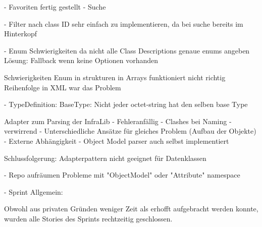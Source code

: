 - Favoriten fertig gestellt
- Suche

- Filter nach class ID sehr einfach zu implementieren, da bei suche bereits im Hinterkopf

- Enum
Schwierigkeiten da nicht alle Class Descriptions genaue enums angeben
Lösung: Fallback wenn keine Optionen vorhanden

Schwierigkeiten Enum in strukturen in Arrays funktioniert nicht richtig
Reihenfolge in XML war das Problem


- TypeDefinition:
BaseType:
   Nicht jeder octet-string hat den selben base Type

Adapter zum Parsing der InfraLib
- Fehleranfällig
- Clashes bei Naming
- verwirrend
- Unterschiedliche Ansätze für gleiches Problem (Aufbau der Objekte)
- Externe Abhängigkeit
- Object Model parser auch selbst implementiert

Schlussfolgerung:
Adapterpattern nicht geeignet für Datenklassen

- Repo aufräumen
Probleme mit "ObjectModel" oder "Attribute" namespace



- Sprint Allgemein:

Obwohl aus privaten Gründen weniger Zeit als erhofft aufgebracht werden konnte, wurden alle Stories des Sprints rechtzeitig geschlossen.
